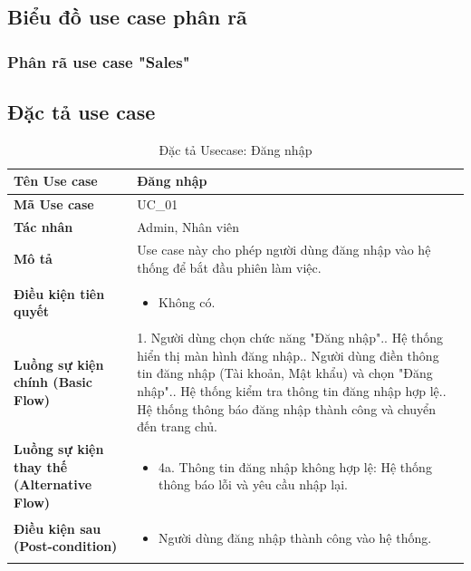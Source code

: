 \documentclass[12pt,a4paper]{report}
\begin{document}
\subsection{Biểu đồ use case phân rã}
\subsubsection{Phân rã use case "Sales"}

\subsection{Đặc tả use case}

\begin{longtable}{|>{\raggedright\arraybackslash\bfseries}p{4.5cm}|p{11cm}|}
\caption{Đặc tả Usecase: Đăng nhập} \label{tab:uc_login} \\
\hline
Tên Use case & Đăng nhập \\ \hline
Mã Use case & UC\_01 \\ \hline
Tác nhân & Admin, Nhân viên \\ \hline
Mô tả & Use case này cho phép người dùng đăng nhập vào hệ thống để bắt đầu phiên làm việc. \\ \hline
Điều kiện tiên quyết & 
\begin{itemize}[leftmargin=*, nosep, topsep=0pt, partopsep=0pt]
    \item Không có.
\end{itemize} \\ \hline
Luồng sự kiện chính (Basic Flow) & 
1. Người dùng chọn chức năng "Đăng nhập".\newline
2. Hệ thống hiển thị màn hình đăng nhập.\newline
3. Người dùng điền thông tin đăng nhập (Tài khoản, Mật khẩu) và chọn "Đăng nhập".\newline
4. Hệ thống kiểm tra thông tin đăng nhập hợp lệ.\newline
5. Hệ thống thông báo đăng nhập thành công và chuyển đến trang chủ. \\ \hline
Luồng sự kiện thay thế (Alternative Flow) & 
\begin{itemize}[leftmargin=*, nosep, topsep=0pt, partopsep=0pt]
    \item 4a. Thông tin đăng nhập không hợp lệ: Hệ thống thông báo lỗi và yêu cầu nhập lại.
\end{itemize} \\ \hline
Điều kiện sau (Post-condition) & 
\begin{itemize}[leftmargin=*, nosep, topsep=0pt, partopsep=0pt]
    \item Người dùng đăng nhập thành công vào hệ thống.
\end{itemize} \\ \hline
\end{longtable}
\end{document}

